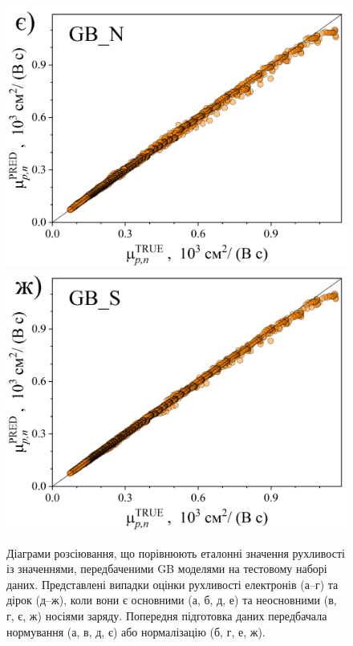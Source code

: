\documentclass[12pt,a4paper,titlepage,oneside]{book}
\numberwithin{equation}{part}
\begin{document}
\begin{figure}
     \includegraphics[width=0.35\linewidth]{GBNpn.png}\kern 20pt
     \includegraphics[width=0.35\linewidth]{GBSpn.png}
	  \caption{Діаграми розсіювання, що порівнюють еталонні значення рухливості із значеннями, передбаченими GB моделями
       на тестовому наборі даних.
       Представлені випадки оцінки рухливості електронів (а--г) та дірок (д--ж), коли вони є
       основними (а, б, д, е) та неосновними (в, г, є, ж) носіями заряду.
       Попередня підготовка даних передбачала нормування (а, в, д, є) або нормалізацію (б, г, е, ж).
}\label{figGB}
\end{figure}
\end{document}
